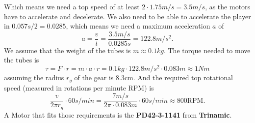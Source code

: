 \noindent Which means we need a top speed of at least $2\cdot1.75m/s=3.5m/s$, as the motors have to accelerate and decelerate.
We also need to be able to accelerate the player in $0.057s/2=0.0285$, which means we need a maximum acceleration $a$ of
\begin{equation}
    \label{eq:acceleration}
    a = \frac{v}{t} = \frac{3.5m/s}{0.0285s} = 122.8m/s^2.
\end{equation}
We assume that the weight of the tubes is $m \approx 0.1kg$.
The torque needed to move the tubes is
\begin{equation}
    \label{eq:torque}
    \tau = F \cdot r = m \cdot a \cdot r = 0.1kg \cdot 122.8m/s^2 \cdot 0.083m \approx 1Nm
\end{equation}
assuming the radius $r_g$ of the gear is 8.3cm.
And the required top rotational speed (measured in rotations per minute $\text{RPM}$) is
\begin{equation}
    \label{eq:top_rpm}
    \frac{v}{2\pi r_g} \cdot 60s/min = \frac{7m/s}{2\pi \cdot 0.083m} \cdot 60s/min \approx 800\text{RPM}.
\end{equation}
A Motor that fits those requirements is the \textbf{PD42-3-1141} from \textbf{Trinamic}.

